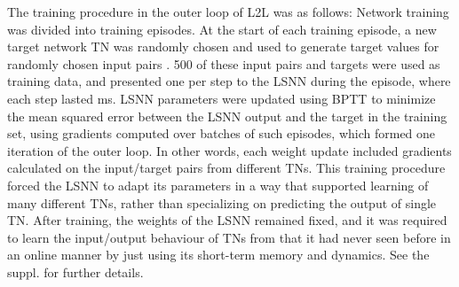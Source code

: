 \documentclass{article} \pdfoutput=1
\begin{document}
The training procedure in the outer loop of L2L was as follows: Network training was divided into training episodes.
At the start of each training episode, a new 
target network TN was randomly chosen and used to generate target values  for randomly chosen input pairs .
500 of these input pairs and targets were used as training data, and presented one per step to the LSNN during the episode, 
where each step lasted  ms.
LSNN parameters were updated using BPTT to minimize the mean squared error between the LSNN output and the target in the training set, using gradients computed over batches of  such episodes, which formed one iteration of the outer loop.
In other words, each weight update included gradients calculated on the input/target pairs from  different TNs. 
This training procedure forced the LSNN to adapt its parameters in a way that supported learning of many different TNs, rather than specializing on predicting the output of single TN.
After training, the weights of the LSNN remained fixed, and it was required to learn the input/output behaviour of TNs from  that it had never seen before in an online manner by just using its short-term memory and dynamics.
See the suppl. for further details.
\end{document}
